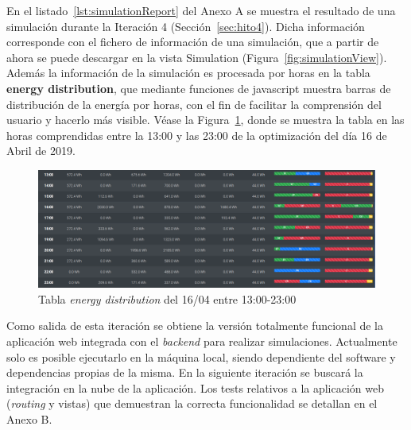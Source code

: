 En el listado~\ref{lst:simulationReport} del Anexo A se muestra el resultado de una simulación durante la Iteración 4 (Sección~\ref{sec:hito4}). Dicha información corresponde con el fichero de información de una simulación, que a partir de ahora se puede descargar en la vista Simulation (Figura~\ref{fig:simulationView}). Además la información de la simulación es procesada por horas en la tabla \textbf{energy distribution}, que mediante funciones de javascript muestra barras de distribución de la energía por horas, con el fin de facilitar la comprensión del usuario y hacerlo más visible. Véase la Figura~\ref{fig:energyDistrib}, donde se muestra la tabla en las horas comprendidas entre la 13:00 y las 23:00 de la optimización del día 16 de Abril de 2019.
\begin{figure}[H]
            \centering
            \includegraphics[width=17cm]{figs/energy_distrib.png}
            \caption{Tabla \textit{energy distribution} del 16/04 entre 13:00-23:00}
            \label{fig:energyDistrib}
\end{figure}


Como salida de esta iteración se obtiene la versión totalmente funcional de la aplicación web integrada con el \textit{backend} para realizar simulaciones. Actualmente solo es posible ejecutarlo en la máquina local, siendo dependiente del software y dependencias propias de la misma. En la siguiente iteración se buscará la integración en la nube de la aplicación. Los tests relativos a la aplicación web (\textit{routing} y vistas) que demuestran la correcta funcionalidad se detallan en el Anexo B.
